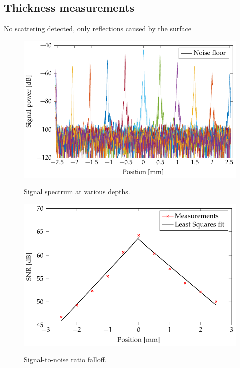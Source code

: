 \subsection{Thickness measurements}
No scattering detected, only reflections caused by the surface


\begin{figure}[hbt]
\myfloatalign
{\includegraphics[width=\linewidth]{gfx/falloff}}
\caption{Signal spectrum at various depths.}\label{fig:power-falloff}
\end{figure}


\begin{figure}[hbt]
\myfloatalign
{\includegraphics[width=0.9\linewidth]{gfx/falloff-fit}}
\caption{Signal-to-noise ratio falloff.}\label{fig:falloff-fit}
\end{figure}



